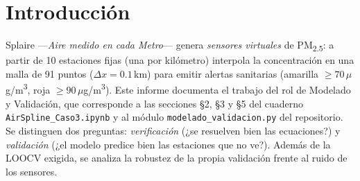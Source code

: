 \documentclass[conference,a4paper]{IEEEtran}
\newcommand{\ugm}{\ensuremath{\mu}g/m\textsuperscript{3}}
\newcommand{\PMdc}{PM\textsubscript{2.5}}
\begin{document}
\section{Introducción}
Splaire ---\emph{Aire medido en cada Metro}--- genera \emph{sensores virtuales} de \PMdc{}: a partir de 10 estaciones fijas (una por
kilómetro) interpola la concentración en una malla de 91 puntos ($\Delta x=0.1$\,km) para emitir
alertas sanitarias (amarilla $\ge 70$\,\ugm, roja $\ge 90$\,\ugm). Este informe documenta el trabajo del
rol de Modelado y Validación, que corresponde a las secciones §2, §3 y §5 del cuaderno
\texttt{AirSpline\_Caso3.ipynb} y al módulo \texttt{modelado\_validacion.py} del repositorio. Se distinguen
dos preguntas: \emph{verificación} (¿se resuelven bien las ecuaciones?) y \emph{validación} (¿el modelo
predice bien las estaciones que no ve?). Además de la LOOCV exigida, se analiza la robustez de la propia
validación frente al ruido de los sensores.

\end{document}
